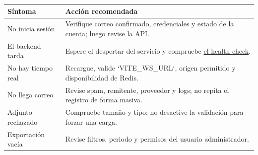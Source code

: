 \begin{tabularx}{\textwidth}{@{}L{0.28\textwidth}Y@{}}
\toprule
\textbf{Síntoma} & \textbf{Acción recomendada}\\
\midrule
No inicia sesión & Verifique correo confirmado, credenciales y estado de la cuenta; luego revise la API.\\
El backend tarda & Espere el despertar del servicio y compruebe \href{\ApiHealthUrl}{el health check}.\\
No hay tiempo real & Recargue, valide `VITE\_WS\_URL`, origen permitido y disponibilidad de Redis.\\
No llega correo & Revise spam, remitente, proveedor y logs; no repita el registro de forma masiva.\\
Adjunto rechazado & Compruebe tamaño y tipo; no desactive la validación para forzar una carga.\\
Exportación vacía & Revise filtros, periodo y permisos del usuario administrador.\\
\bottomrule
\end{tabularx}
